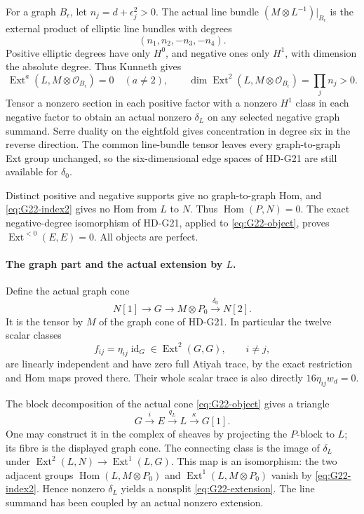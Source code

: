 For a graph \(B_\epsilon\), let \(n_j=d+\epsilon_j^2>0\).
The actual line bundle \((M\otimes L^{-1})|_{B_\epsilon}\)
is the external product of elliptic line bundles with degrees
\[
                         (n_1,n_2,-n_3,-n_4).
\]
Positive elliptic degrees have only \(H^0\), and negative ones
only \(H^1\), with dimension the absolute degree. Thus Kunneth gives
\begin{equation}\label{eq:G22-index2}
 \operatorname{Ext}^a(L,M\otimes\mathcal O_{B_\epsilon})=0
       \quad(a\ne2),\qquad
 \dim\operatorname{Ext}^2(L,M\otimes\mathcal O_{B_\epsilon})
                         =\prod_j n_j>0.
\end{equation}
Tensor a nonzero section in each positive factor with a nonzero
\(H^1\) class in each negative factor to obtain an actual nonzero
\(\delta_L\) on any selected negative graph summand. Serre duality
on the eightfold gives concentration in degree six in the reverse
direction. The common line-bundle tensor leaves every graph-to-graph
Ext group unchanged, so the six-dimensional edge spaces of HD-G21
are still available for \(\delta_0\).

Distinct positive and negative supports give no graph-to-graph Hom,
and \eqref{eq:G22-index2} gives no Hom from \(L\) to \(N\).
Thus \(\operatorname{Hom}(P,N)=0\). The exact negative-degree
isomorphism of HD-G21, applied to \eqref{eq:G22-object}, proves
\(\operatorname{Ext}^{<0}(E,E)=0\). All objects are perfect.

\paragraph{The graph part and the actual extension by \(L\).}
Define the actual graph cone
\[
 N[1]\longrightarrow G\longrightarrow M\otimes P_0
                             \xrightarrow{\delta_0}N[2].
\]
It is the tensor by \(M\) of the graph cone of HD-G21. In particular
the twelve scalar classes
\[
 f_{ij}=\eta_{ij}\operatorname{id}_G\in\operatorname{Ext}^2(G,G),
 \qquad i\ne j,
\]
are linearly independent and have zero full Atiyah trace, by the
exact restriction and Hom maps proved there. Their whole scalar
trace is also directly \(16\eta_{ij}w_d=0\).

The block decomposition of the actual cone
\eqref{eq:G22-object} gives a triangle
\begin{equation}\label{eq:G22-extension}
            G\xrightarrow{i}E\xrightarrow{q_L}L
                                      \xrightarrow{\kappa}G[1].
\end{equation}
One may construct it in the complex of sheaves by projecting the
\(P\)-block to \(L\); its fibre is the displayed graph cone.
The connecting class is the image of \(\delta_L\) under
\(\operatorname{Ext}^2(L,N)\to\operatorname{Ext}^1(L,G)\).
This map is an isomorphism: the two adjacent groups
\(\operatorname{Hom}(L,M\otimes P_0)\) and
\(\operatorname{Ext}^1(L,M\otimes P_0)\) vanish by
\eqref{eq:G22-index2}. Hence nonzero \(\delta_L\) yields a
nonsplit \eqref{eq:G22-extension}. The line summand has been
coupled by an actual nonzero extension.

